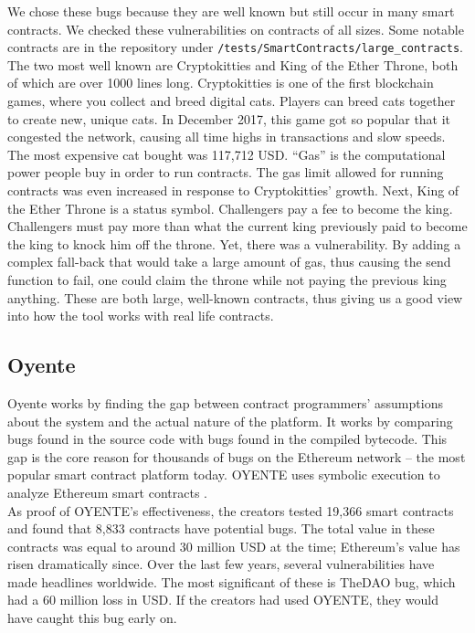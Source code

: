 We chose these bugs because they are well known but still occur in many smart contracts. We checked these vulnerabilities on contracts of all sizes. Some notable contracts are in the repository under \texttt{/tests/SmartContracts/large\_contracts}. The two most well known are Cryptokitties and King of the Ether Throne, both of which are over 1000 lines long. Cryptokitties is one of the first blockchain games, where you collect and breed digital cats. Players can breed cats together to create new, unique cats. In December 2017, this game got so popular that it congested the network, causing all time highs in transactions and slow speeds. The most expensive cat bought was 117,712 USD. ``Gas'' is the computational power people buy in order to run contracts. The gas limit allowed for running contracts was even increased in response to Cryptokitties' growth. Next, King of the Ether Throne is a status symbol. Challengers pay a fee to become the king. Challengers must pay more than what the current king previously paid to become the king to knock him off the throne. Yet, there was a vulnerability. By adding a complex fall-back that would take a large amount of gas, thus causing the send function to fail, one could claim the throne while not paying the previous king anything. These are both large, well-known contracts, thus giving us a good view into how the tool works with real life contracts.


\subsection*{Oyente}
Oyente works by finding the gap between contract programmers' assumptions about the system and the actual nature of the platform. It works by comparing bugs found in the source code with bugs found in the compiled bytecode. This gap is the core reason for thousands of bugs on the Ethereum network -- the most popular smart contract platform today. OYENTE uses symbolic execution to analyze Ethereum smart contracts \cite{luu2016making}. \\

As proof of OYENTE's effectiveness, the creators tested 19,366 smart contracts and found that 8,833 contracts have potential bugs. The total value in these contracts was equal to around 30 million USD at the time; Ethereum's value has risen dramatically since. Over the last few years, several vulnerabilities have made headlines worldwide. The most significant of these is TheDAO bug, which had a 60 million loss in USD. If the creators had used OYENTE, they would have caught this bug early on. \\

